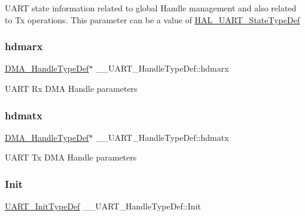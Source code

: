 U\+A\+RT state information related to global Handle management and also related to Tx operations. This parameter can be a value of \mbox{\hyperlink{group___u_a_r_t___exported___types_ga94c58ae1f4dbcf6032224edfc93a6e19}{H\+A\+L\+\_\+\+U\+A\+R\+T\+\_\+\+State\+Type\+Def}} \mbox{\label{struct_____u_a_r_t___handle_type_def_aad7929af8d6acf108c85fe9c7b83c128}} 
\subsubsection{\texorpdfstring{hdmarx}{hdmarx}}
{\footnotesize\ttfamily \mbox{\hyperlink{group___d_m_a___exported___types_ga41b754a906b86bce54dc79938970138b}{D\+M\+A\+\_\+\+Handle\+Type\+Def}}$\ast$ \+\_\+\+\_\+\+U\+A\+R\+T\+\_\+\+Handle\+Type\+Def\+::hdmarx}

U\+A\+RT Rx D\+MA Handle parameters \mbox{\label{struct_____u_a_r_t___handle_type_def_afdedbb0ffa1d4bc145a01434d4794c92}} 
\subsubsection{\texorpdfstring{hdmatx}{hdmatx}}
{\footnotesize\ttfamily \mbox{\hyperlink{group___d_m_a___exported___types_ga41b754a906b86bce54dc79938970138b}{D\+M\+A\+\_\+\+Handle\+Type\+Def}}$\ast$ \+\_\+\+\_\+\+U\+A\+R\+T\+\_\+\+Handle\+Type\+Def\+::hdmatx}

U\+A\+RT Tx D\+MA Handle parameters \mbox{\label{struct_____u_a_r_t___handle_type_def_a56ed519d3ec77350c528fb8536bd9f5a}} 
\subsubsection{\texorpdfstring{Init}{Init}}
{\footnotesize\ttfamily \mbox{\hyperlink{struct_u_a_r_t___init_type_def}{U\+A\+R\+T\+\_\+\+Init\+Type\+Def}} \+\_\+\+\_\+\+U\+A\+R\+T\+\_\+\+Handle\+Type\+Def\+::\+Init}

